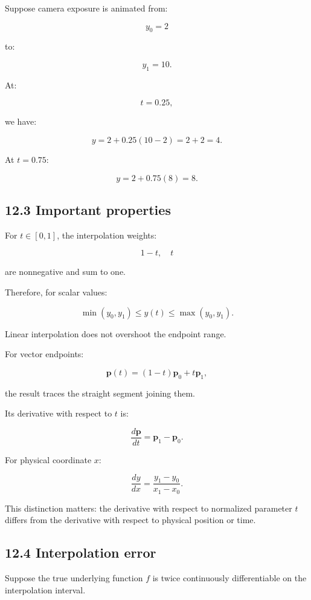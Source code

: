 Suppose camera exposure is animated from:

\[ y_0=2 \]

to:

\[ y_1=10. \]

At:

\[ t=0.25, \]

we have:

\[ y=2+0.25(10-2) =2+2 =\boxed4. \]

At \(t=0.75\):

\[ y=2+0.75(8)=8. \]

\subsection{12.3 Important properties}\label{02-foundations-ii-ch028-important-properties}

For \(t\in[0,1]\), the interpolation weights:

\[ 1-t,\quad t \]

are nonnegative and sum to one.

Therefore, for scalar values:

\[ \boxed{ \min(y_0,y_1)\le y(t)\le\max(y_0,y_1) }. \]

Linear interpolation does not overshoot the endpoint range.

For vector endpoints:

\[ \mathbf p(t)=(1-t)\mathbf p_0+t\mathbf p_1, \]

the result traces the straight segment joining them.

Its derivative with respect to \(t\) is:

\[ \boxed{ \frac{d\mathbf p}{dt} = \mathbf p_1-\mathbf p_0 }. \]

For physical coordinate \(x\):

\[ \boxed{ \frac{dy}{dx} = \frac{y_1-y_0}{x_1-x_0} }. \]

This distinction matters: the derivative with respect to normalized parameter \(t\) differs from the derivative with respect to physical position or time.

\subsection{12.4 Interpolation error}\label{02-foundations-ii-ch028-interpolation-error}

Suppose the true underlying function \(f\) is twice continuously differentiable on the interpolation interval.

